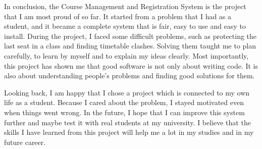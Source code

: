 \documentclass[12pt,a4paper]{article}
\begin{document}
In conclusion, the Course Management and Registration System is the project
that I am most proud of so far. It started from a problem that I had as a
student, and it became a complete system that is fair, easy to use and easy to
install. During the project, I faced some difficult problems, such as
protecting the last seat in a class and finding timetable clashes. Solving
them taught me to plan carefully, to learn by myself and to explain my ideas
clearly. Most importantly, this project has shown me that good software is not
only about writing code. It is also about understanding people's problems and
finding good solutions for them.

Looking back, I am happy that I chose a project which is connected to my own
life as a student. Because I cared about the problem, I stayed motivated even
when things went wrong. In the future, I hope that I can improve this system
further and maybe test it with real students at my university. I believe that
the skills I have learned from this project will help me a lot in my studies
and in my future career.
\end{document}
